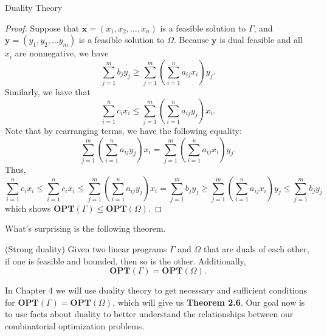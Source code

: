 \begin{section}{Duality Theory}
	\begin{proof}
		Suppose that $\mathbf{x} = (x_1, x_2,\dots,x_n)$ is a feasible solution to $\Gamma$, and 
		$\mathbf{y} = (y_1, y_2, \dots y_m)$ is a feasible solution to $\Omega$. Because 
		$\mathbf{y}$ is dual feasible and all $x_i$ are nonnegative, we have 
		\[
			\sum_{j=1}^{m} b_j y_j \geq \sum_{j=1}^{m}\left(\sum_{i=1}^{n} a_{ij}x_i\right) 
			y_j.
		\]
		Similarly, we have that 
		\[
			\sum_{i=1}^{n} c_i x_i \leq \sum_{j=1}^{m}\left(\sum_{i=1}^{n} a_{ij} y_j\right) 
			x_i.
		\]
		Note that by rearranging terms, we have the following equality:
		\[
			\sum_{j=1}^{m}\left(\sum_{i=1}^{n} a_{ij} y_j\right) 
			x_i =
			\sum_{j=1}^{m}\left(\sum_{i=1}^{n} a_{ij}x_i\right) 
			y_j.
		\]
		Thus,
		\[
			\sum_{i=1}^{n} c_i x_i \leq
			\sum_{i=1}^{n} c_i x_i \leq \sum_{j=1}^{m}\left(\sum_{i=1}^{n} a_{ij} y_j\right) 
			x_i =
			\sum_{j=1}^{m} b_j y_j \geq \sum_{j=1}^{m}\left(\sum_{i=1}^{n} a_{ij}x_i\right) 
			y_j \leq
			\sum_{j=1}^{m} b_j y_j
		\]
		which shows $\mathbf{OPT}(\Gamma) \leq \mathbf{OPT}(\Omega)$.
	\end{proof}
	What's surprising is the following theorem.

	\begin{theorem}{(Strong duality)}
		Given two linear programs $\Gamma$ and $\Omega$ that are duals of each other, if one is 
		feasible and bounded, then so is the other. Additionally, 
		\[
			\mathbf{OPT}(\Gamma) = \mathbf{OPT}(\Omega).
		\]
	\end{theorem} 
	In Chapter 4 we will use duality theory to get necessary and sufficient conditions for 
	$\mathbf{OPT}(\Gamma) = \mathbf{OPT}(\Omega)$, which will give us \textbf{Theorem 2.6}.
	Our goal now is to use facts about duality to better understand the relationships between 
	our combinatorial optimization problems.


\end{section}
